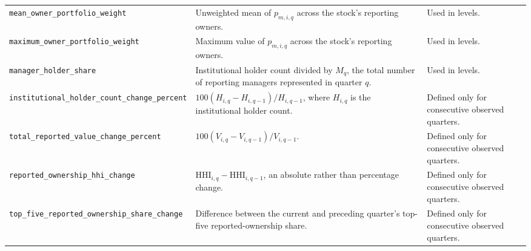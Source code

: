 \begin{longtable}{>{\raggedright\arraybackslash}p{}>{\raggedright\arraybackslash}p{}>{\raggedright\arraybackslash}p{}}
        \nolinkurl{mean_owner_portfolio_weight}
                & Unweighted mean of $p_{m,i,q}$ across the stock's reporting owners.
                & Used in levels.                                                                                                                                                              \\
        \nolinkurl{maximum_owner_portfolio_weight}
                & Maximum value of $p_{m,i,q}$ across the stock's reporting owners.
                & Used in levels.                                                                                                                                                              \\
        \nolinkurl{manager_holder_share}
                & Institutional holder count divided by $M_q$, the total number of reporting managers represented in quarter $q$.
                & Used in levels.                                                                                                                                                              \\
        \nolinkurl{institutional_holder_count_change_percent}
                & $100(H_{i,q}-H_{i,q-1})/H_{i,q-1}$, where $H_{i,q}$ is the institutional holder count.
                & Defined only for consecutive observed quarters.                                                                                                                              \\
        \nolinkurl{total_reported_value_change_percent}
                & $100(V_{i,q}-V_{i,q-1})/V_{i,q-1}$.
                & Defined only for consecutive observed quarters.                                                                                                                              \\
        \nolinkurl{reported_ownership_hhi_change}
                & $\mathrm{HHI}_{i,q}-\mathrm{HHI}_{i,q-1}$, an absolute rather than percentage change.
                & Defined only for consecutive observed quarters.                                                                                                                              \\
        \nolinkurl{top_five_reported_ownership_share_change}
                & Difference between the current and preceding quarter's top-five reported-ownership share.
                & Defined only for consecutive observed quarters.                                                                                                                              \\
\end{longtable}
\endgroup

